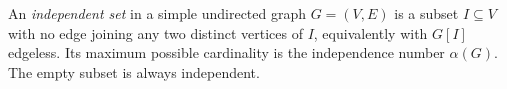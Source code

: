 
An \emph{independent set} in a simple undirected graph $G=(V,E)$ is a subset $I\subseteq V$ with no edge joining any two distinct vertices of $I$, equivalently with $G[I]$ edgeless. Its maximum possible cardinality is the independence number $\alpha(G)$. The empty subset is always independent.
